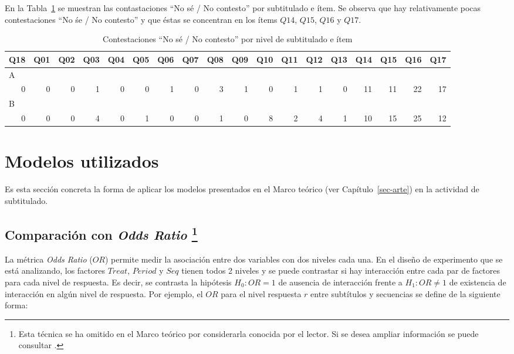 \documentclass[
  12pt,
  a4paper,
  extrafontsizes,
  onecolumn,
  openright,
  table]{memoir}
\begin{document}
En la Tabla~\ref{tbl-no-response} se muestran las contastaciones
\enquote{No sé / No contesto} por subtitulado e ítem. Se observa que hay
relativamente pocas contestaciones \enquote{No śe / No contesto} y que
éstas se concentran en los ítems \(Q14\), \(Q15\), \(Q16\) y \(Q17\).

\tiny

\hypertarget{tbl-no-response}{}
\begin{longtable}{rrrrrrrrrrrrrrrrrr}
\caption{\label{tbl-no-response}Contestaciones ``No sé / No contesto'' por nivel de subtitulado e ítem }\tabularnewline

\toprule
Q18 & Q01 & Q02 & Q03 & Q04 & Q05 & Q06 & Q07 & Q08 & Q09 & Q10 & Q11 & Q12 & Q13 & Q14 & Q15 & Q16 & Q17 \\ 
\midrule
\multicolumn{18}{l}{A} \\ 
\midrule
0 & 0 & 0 & 1 & 0 & 0 & 1 & 0 & 3 & 1 & 0 & 1 & 1 & 0 & 11 & 11 & 22 & 17 \\ 
\midrule
\multicolumn{18}{l}{B} \\ 
0 & 0 & 0 & 4 & 0 & 1 & 0 & 0 & 1 & 0 & 8 & 2 & 4 & 1 & 10 & 15 & 25 & 12 \\ 
\bottomrule
\end{longtable}

\normalsize

\hypertarget{sec-modelos-utilizados}{%
\section{Modelos utilizados}\label{sec-modelos-utilizados}}

Es esta sección concreta la forma de aplicar los modelos presentados en
el Marco teórico (ver Capítulo~\ref{sec-arte}) en la actividad de
subtitulado.

\hypertarget{sec-or-2}{%
\subsection[Comparación con \emph{Odds Ratio}
]{\texorpdfstring{Comparación con \emph{Odds Ratio}
\footnote{Esta técnica se ha omitido en el Marco teórico por
  considerarla conocida por el lector. Si se desea ampliar información
  se puede consultar \textcite[p.~18]{agresti2010}.}}{Comparación con Odds Ratio }}\label{sec-or-2}}

La métrica \emph{Odds Ratio} (\(OR\)) permite medir la asociación entre
dos variables con dos niveles cada una. En el diseño de experimento que
se está analizando, los factores \(Treat\), \(Period\) y \(Seq\) tienen
todos 2 niveles y se puede contrastar si hay interacción entre cada par
de factores para cada nivel de respuesta. Es decir, se contrasta la
hipótesis \(H_0: OR=1\) de ausencia de interacción frente a
\(H_1: OR \neq 1\) de existencia de interacción en algún nivel de
respuesta. Por ejemplo, el \(OR\) para el nivel respuesta \(r\) entre
subtítulos y secuencias se define de la siguiente forma:
\end{document}

